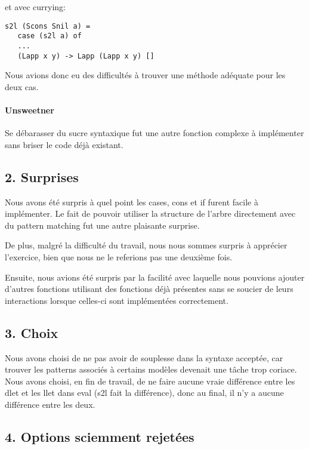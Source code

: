 et avec currying:

\begin{verbatim}
s2l (Scons Snil a) =
   case (s2l a) of
   ...
   (Lapp x y) -> Lapp (Lapp x y) []
\end{verbatim}

Nous avions donc eu des difficultés à trouver une méthode adéquate pour
les deux cas.

\paragraph{Unsweetner}\label{unsweetner}

Se débarasser du sucre syntaxique fut une autre fonction complexe à
implémenter sans briser le code déjà existant.

\subsection{2. Surprises}\label{surprises}

Nous avons été surpris à quel point les cases, cons et if furent facile
à implémenter. Le fait de pouvoir utiliser la structure de l'arbre
directement avec du pattern matching fut une autre plaisante surprise.

De plus, malgré la difficulté du travail, nous nous sommes surpris à
apprécier l'exercice, bien que nous ne le referions pas une deuxième
fois.

Ensuite, nous avions été surpris par la facilité avec laquelle nous
pouvions ajouter d'autres fonctions utilisant des fonctions déjà
présentes sans se soucier de leurs interactions lorsque celles-ci sont
implémentées correctement.

\subsection{3. Choix}\label{choix}

Nous avons choisi de ne pas avoir de souplesse dans la syntaxe acceptée,
car trouver les patterns associés à certains modèles devenait une tâche
trop coriace. Nous avons choisi, en fin de travail, de ne faire aucune
vraie différence entre les dlet et les llet dans eval (s2l fait la
différence), donc au final, il n'y a aucune différence entre les deux.

\subsection{4. Options sciemment
rejetées}\label{options-sciemment-rejetuxe9es}
